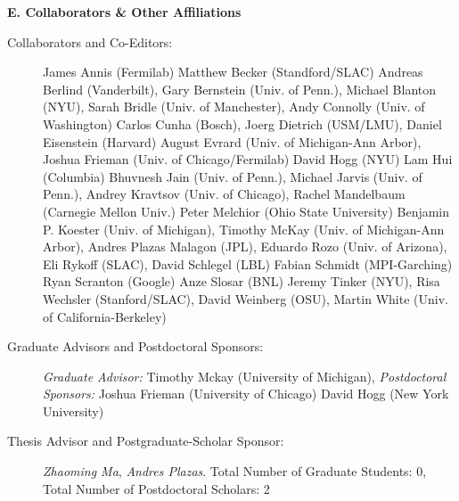 \documentclass[10pt]{article}
\begin{document}
{\large \bf E. Collaborators \& Other Affiliations}
\begin{description}
\item[Collaborators and Co-Editors:]

    James Annis (Fermilab)
    Matthew Becker (Standford/SLAC)
    Andreas Berlind (Vanderbilt),
    Gary Bernstein (Univ. of Penn.),
    Michael Blanton (NYU),
    Sarah Bridle (Univ. of Manchester),
    Andy Connolly (Univ. of Washington)
    Carlos Cunha (Bosch), 
    Joerg Dietrich (USM/LMU),
    Daniel Eisenstein (Harvard)
    August Evrard (Univ. of Michigan-Ann Arbor), 
    Joshua Frieman (Univ. of Chicago/Fermilab)
    David Hogg (NYU)
    Lam Hui (Columbia)
    Bhuvnesh Jain (Univ. of Penn.),
    Michael Jarvis (Univ. of Penn.),
    Andrey Kravtsov (Univ. of Chicago),
    Rachel Mandelbaum (Carnegie Mellon Univ.)
    Peter Melchior (Ohio State University)
    Benjamin P. Koester (Univ. of Michigan),
    Timothy McKay (Univ. of Michigan-Ann Arbor), 
    Andres Plazas Malagon (JPL),
    Eduardo Rozo (Univ. of Arizona), 
    Eli Rykoff (SLAC),
    David Schlegel (LBL)
    Fabian Schmidt (MPI-Garching)
    Ryan Scranton (Google)
    Anze Slosar (BNL)
    Jeremy Tinker (NYU),
    Risa Wechsler (Stanford/SLAC),
    David Weinberg (OSU),
    Martin White (Univ. of California-Berkeley)

\item[Graduate Advisors and Postdoctoral Sponsors:] \textit{Graduate Advisor:}
    Timothy Mckay (University of Michigan),
    \textit{Postdoctoral Sponsors:} Joshua Frieman (University of Chicago)
    David Hogg (New York University)

\item[Thesis Advisor and Postgraduate-Scholar Sponsor:] \textit{Zhaoming Ma},
    \textit{Andres Plazas}. Total Number of Graduate Students: 0, Total Number
    of Postdoctoral Scholars: 2

\end{description}

\end{document}
